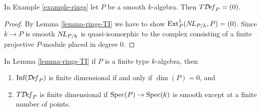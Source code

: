\begin{lemma}
\label{lemma-smooth}
In Example \ref{example-rings} let $P$ be a smooth $k$-algebra. Then
$T\mathcal{D}\!\mathit{ef}_P = (0)$.
\end{lemma}

\begin{proof}
By Lemma \ref{lemma-rings-TI} we have to show
$\text{Ext}^1_P(\mathop{N\!L}\nolimits_{P/k}, P) = (0)$.
Since $k \to P$ is smooth $\mathop{N\!L}\nolimits_{P/k}$ is quasi-isomorphic to the
complex consisting of a finite projective
$P$-module placed in degree $0$.
\end{proof}

\begin{lemma}
\label{lemma-finite-type-rings-TI}
In Lemma \ref{lemma-rings-TI} if $P$ is a finite type $k$-algebra, then
\begin{enumerate}
\item $\text{Inf}(\mathcal{D}\!\mathit{ef}_P)$ is finite dimensional if and only if
$\dim(P) = 0$, and
\item $T\mathcal{D}\!\mathit{ef}_P$ is finite dimensional if
$\mathop{\mathrm{Spec}}(P) \to \mathop{\mathrm{Spec}}(k)$ is smooth except at a finite number of points.
\end{enumerate}
\end{lemma}


